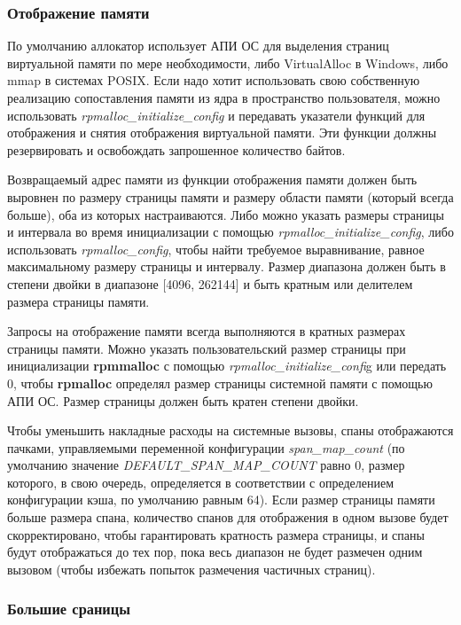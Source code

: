 \subsubsection{Отображение памяти}

По умолчанию аллокатор использует АПИ ОС для выделения страниц виртуальной памяти по мере необходимости, либо VirtualAlloc в Windows, либо mmap в системах POSIX. Если надо хотит использовать свою собственную реализацию сопоставления памяти из ядра в пространство пользователя, можно использовать \textit{rpmalloc\_initialize\_config }и передавать указатели функций для отображения и снятия отображения виртуальной памяти. Эти функции должны резервировать и освобождать запрошенное количество байтов.

Возвращаемый адрес памяти из функции отображения памяти должен быть выровнен по размеру страницы памяти и размеру области памяти (который всегда больше), оба из которых настраиваются. Либо можно указать размеры страницы и интервала во время инициализации с помощью \textit{rpmalloc\_initialize\_config}, либо использовать \textit{rpmalloc\_config}, чтобы найти требуемое выравнивание, равное максимальному размеру страницы и интервалу. Размер диапазона должен быть в степени двойки в диапазоне [4096, 262144] и быть кратным или делителем размера страницы памяти.

Запросы на отображение памяти всегда выполняются в кратных размерах страницы памяти. Можно указать пользовательский размер страницы при инициализации \textbf{rpmmalloc} с помощью \textit{rpmalloc\_initialize\_confi}g или передать 0, чтобы \textbf{rpmalloc} определял размер страницы системной памяти с помощью АПИ ОС. Размер страницы должен быть кратен степени двойки.

Чтобы уменьшить накладные расходы на системные вызовы, спаны отображаются пачками, управляемыми переменной конфигурации \textit{span\_map\_count} (по умолчанию значение \textit{DEFAULT\_SPAN\_MAP\_COUNT} равно 0, размер которого, в свою очередь, определяется в соответствии с определением конфигурации кэша, по умолчанию равным 64). Если размер страницы памяти больше размера спана, количество спанов для отображения в одном вызове будет скорректировано, чтобы гарантировать кратность размера страницы, и спаны будут отображаться до тех пор, пока весь диапазон не будет размечен одним вызовом (чтобы избежать попыток размечения частичных страниц).

\subsubsection{Большие сраницы}

